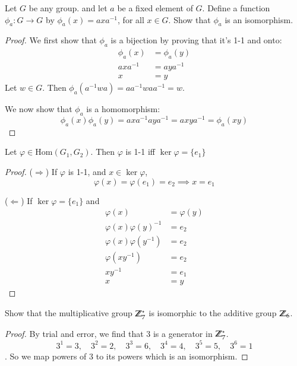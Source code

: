 Let $G$ be any group. and let $a$ be a fixed element of $G$. Define a function $\phi_a: G\to G$ by $\phi_a(x)=axa^{-1}$, for all $x\in G$. Show that $\phi_a$ is an isomorphism. 
\begin{proof}
We first show that $\phi_a$ is a bijection by proving that it's 1-1 and onto:
\begin{align*}
	\phi_a(x) &= \phi_a(y) \\
	axa^{-1} &= aya^{-1} \\
	x &= y
\end{align*}
Let $w\in G$. Then $\phi_a(a^{-1}wa) = aa^{-1}waa^{-1} = w$. 

We now show that $\phi_a$ is a homomorphism: 
\[\phi_a(x)\phi_a(y) = axa^{-1}aya^{-1} = axya^{-1} = \phi_a(xy)\]
\end{proof}

\begin{proposition}
Let $\varphi\in \mathrm{Hom}(G_1, G_2)$. Then $\varphi$ is 1-1 iff $\ker \varphi = \{e_1\}$	
\end{proposition}
\begin{proof}
($\Rightarrow$) If $\varphi$ is 1-1, and $x\in \ker \varphi$, 
\[\varphi(x) = \varphi(e_1)=e_2 \implies x=e_1\]	

($\Leftarrow$) If $\ker \varphi = \{e_1\}$ and
\begin{align*}
\varphi(x) &= \varphi(y) \\
\varphi(x)\varphi(y)^{-1} &= e_2 \\
	\varphi(x)\varphi(y^{-1}) &= e_2 \\
	\varphi(xy^{-1}) &= e_2 \\
	xy^{-1} &= e_1 \\
	x &= y
\end{align*}
\end{proof}

 Show that the multiplicative group $\mathbb{Z}_7^*$ is isomorphic to the additive group $\mathbb{Z}_6$. 
\begin{proof}
By trial and error, we find that $3$ is a generator in $\mathbb{Z}_7^*$. 
\[3^1 = 3, \quad 3^2 = 2, \quad 3^3 = 6, \quad 3^4 = 4, \quad 3^5 = 5, \quad 3^6 = 1\].
So we map powers of $3$ to its powers which is an isomorphism. 
\end{proof}


